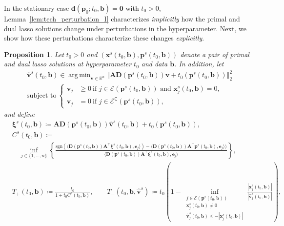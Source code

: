 \documentclass[11pt]{article}
\newtheorem{prop}{Proposition}[section]
\numberwithin{prop}{section}
\numberwithin{lem}{section}
\numberwithin{rem}{section}
\numberwithin{cor}{section}
\numberwithin{thm}{section}
\numberwithin{defn}{section}
\numberwithin{fact}{section}
\theoremstyle{plain}
\def\bb {\boldsymbol{b}}
\def\bd {\boldsymbol{d}}
\def\tzero {t_{0}}
\def\be {\boldsymbol{e}}
\def\bp {\boldsymbol{p}}
\def\bv {\boldsymbol{v}}
\def\bx {\boldsymbol{x}}
\def\R {\mathbb{R}}
\def\bxi {\boldsymbol{\xi}}
\newcommand{\normsq}[1]{\left\Vert{#1} \right\Vert_{2}^{2}}
\newcommand{\matr}[1]{\bm{#1}}
\def\sign {\mathrm{sgn}}
\def\Rn {\R^n}
\DeclareMathOperator*{\argmin}{arg\,min}
\def\bpo {\bp_{0}}
\def\eqset {\mathcal{E}}
\def\Atop {\matr{A}^{\top}}
\begin{document}
In the stationary case $\bd(\bpo;\tzero,\bb) = \boldsymbol{0}$ with $\tzero>0$, Lemma~\ref{lem:tech_perturbation_I} characterizes \emph{implicitly} how the primal and dual lasso solutions change under perturbations in the hyperparameter. Next, we show how these perturbations characterize these changes \emph{explicitly}.
\begin{prop}\label{prop:generalized_homotopy}
Let $\tzero > 0$ and $(\bx^{s}(\tzero,\bb),\bp^{s}(\tzero,\bb))$ denote a pair of primal and dual lasso solutions at hyperparameter $\tzero$ and data $\bb$. In addition, let
	\begin{equation}\label{eq:nnls_problem_v_3}
    \begin{alignedat}{1}
        &\hat{\bv}^{s}(\tzero,\bb) \in \argmin_{\bv \in \Rn} \normsq{\matr{A}\matr{D}(\bp^{s}(\tzero,\bb))\bv + t_{0}(\bp^{s}(\tzero,\bb))} \\
        &\text{subject to} \
            \begin{cases}
                \bv_{j} &\geqslant 0 \ \text{if $j \in \mathcal{E}(\bp^{s}(\tzero,\bb))$ and $\bx^{s}_{j}(\tzero,\bb) = 0$}, \\
                \bv_{j} &= 0 \ \text{if $j \in \mathcal{E}^{\mathsf{C}}(\bp^{s}(\tzero,\bb))$},
            \end{cases}
        \end{alignedat}
	\end{equation}	
	and define
	\begin{equation}\label{eq:homotopy_parameters}
    \begin{alignedat}{1}
    &\bxi^{s}(\tzero,\bb) \coloneqq \matr{A}\matr{D}(\bp^{s}(\tzero,\bb))\hat{\bv}^{s}(\tzero,\bb) + \tzero(\bp^{s}(\tzero,\bb)), \\
    & C^{s}(\tzero, \bb) \coloneqq \\
    &\quad \inf_{j \in \{1,\dots,n\}} \left\{\frac{\sign{\left(\langle \matr{D}(\bp^{s}(\tzero,\bb))\Atop\bxi^{s}(\tzero,\bb),\be_j\rangle\right)} - \langle \matr{D}(\bp^{s}(\tzero,\bb))\Atop\bp^{s}(\tzero,\bb),\be_j\rangle)}{\langle\matr{D}(\bp^{s}(\tzero,\bb)) \Atop\bxi^{s}(\tzero,\bb),\be_j\rangle} \right\}, \\
    & T_{+}(\tzero,\bb) \coloneqq \frac{\tzero}{1 + \tzero C^{s}(\tzero, \bb)}, \qquad T_{-}(\tzero,\bb,\hat{\bv}^{s}) \coloneqq  \tzero \left(1 - \inf_{\substack{j \in \eqset(\bp^{s}(\tzero,\bb)) \\ \bx^{s}_{j}(\tzero,\bb) \neq 0 \\ \hat{\bv}_{j}^{s}(\tzero,\bb) \leqslant -|\bx_{j}^{s}(\tzero,\bb)|}} \frac{|\bx_{j}^{s}(\tzero,\bb)|}{|\hat{\bv}^{s}_{j}(\tzero,\bb)|}\right), \\

\end{alignedat}
\end{equation}
\end{prop}
\end{document}
